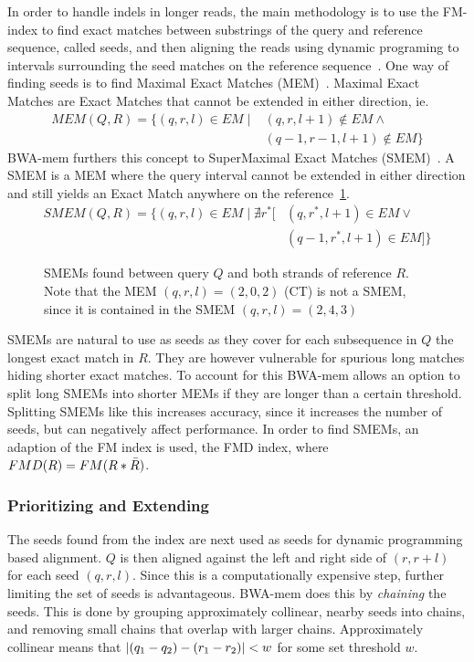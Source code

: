 In order to handle indels in longer reads, the main methodology is to use the FM-index to find exact matches between substrings of the query and reference sequence, called seeds, and then aligning the reads using dynamic programing to intervals surrounding the seed matches on the reference sequence~\cite{bowtie2}.
One way of finding seeds is to find Maximal Exact Matches (MEM)~\cite{longmem}.
Maximal Exact Matches are Exact Matches that cannot be extended in either direction, ie. 
\begin{align*}
  MEM(Q, R) = \{(q, r, l) \in EM \mid &(q, r, l+1) \notin EM \wedge \\
  & (q-1, r-1, l+1) \notin EM \}
\end{align*}
BWA-mem furthers this concept to SuperMaximal Exact Matches (SMEM)~\cite{origsmem}.
A SMEM is a MEM where the query interval cannot be extended in either direction and still yields an Exact Match anywhere on the reference~\ref{fig:smem}.
\begin{align*}
  SMEM(Q, R) = \{(q, r, l) \in EM \mid \nexists r^*[&(q, r^*, l+1) \in EM \vee\\
    &(q-1, r^*, l+1) \in EM] \}
\end{align*}
\begin{figure}
  \tikzpicture
  
  \endtikzpicture
  \caption{SMEMs found between query $Q$ and both strands of reference $R$. Note that the MEM $(q, r, l)=(2, 0, 2)$ (CT) is not a SMEM, since it is contained in the SMEM $(q, r, l) = (2, 4, 3)$}
  \label{fig:smem}
\end{figure}

SMEMs are natural to use as seeds as they cover for each subsequence in $Q$ the longest exact match in $R$.
They are however vulnerable for spurious long matches hiding shorter exact matches.
To account for this BWA-mem allows an option to split long SMEMs into shorter MEMs if they are longer than a certain threshold.
Splitting SMEMs like this increases accuracy, since it increases the number of seeds, but can negatively affect performance. 
In order to find SMEMs, an adaption of the FM index is used, the FMD index, where $FMD(R) = FM(R * \bar{R})$.

\subsubsection{Prioritizing and Extending}
The seeds found from the index are next used as seeds for dynamic programming based alignment.
$Q$ is then aligned against the left and right side of $(r, r+l)$ for each seed $(q, r, l)$.
Since this is a computationally expensive step, further limiting the set of seeds is advantageous.
BWA-mem does this by \emph{chaining} the seeds.
This is done by grouping approximately collinear, nearby seeds into chains, and removing small chains that overlap with larger chains.
Approximately collinear means that $\left | (q_1-q_2) -(r_1-r_2) \right |<w$ for some set threshold $w$.

